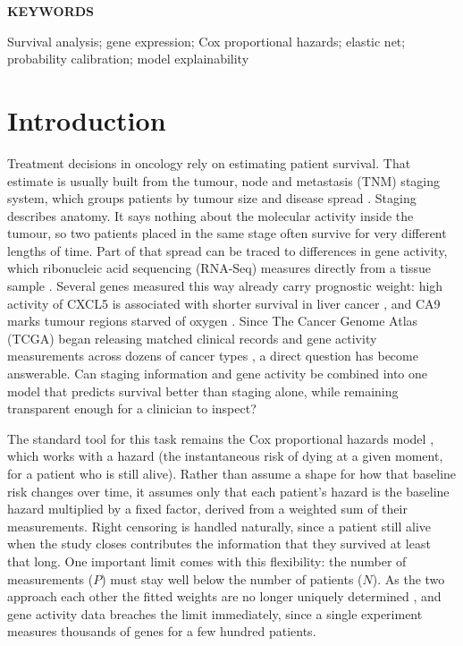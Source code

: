 \documentclass[10pt,a4paper]{article}
\begin{document}
\vspace{1em}
{\bfseries KEYWORDS\par}

Survival analysis; gene expression; Cox proportional hazards; elastic net;
probability calibration; model explainability

\vspace{3pt}

\section{Introduction}
\label{sec:introduction}

Treatment decisions in oncology rely on estimating patient survival. That estimate is usually built from the tumour, node and metastasis (TNM) staging system, which groups patients by tumour size and disease spread \citep{amin2017ajcc}. Staging describes anatomy. It says nothing about the molecular activity inside the tumour, so two patients placed in the same stage often survive for very different lengths of time. Part of that spread can be traced to differences in gene activity, which ribonucleic acid sequencing (RNA-Seq) measures directly from a tissue sample \citep{li2011rsem}. Several genes measured this way already carry prognostic weight: high activity of CXCL5 is associated with shorter survival in liver cancer \citep{zhou2012overexpression}, and CA9 marks tumour regions starved of oxygen \citep{giatromanolaki2001carbonic}. Since The Cancer Genome Atlas (TCGA) began releasing matched clinical records and gene activity measurements across dozens of cancer types \citep{weinstein2013cancer}, a direct question has become answerable. Can staging information and gene activity be combined into one model that predicts survival better than staging alone, while remaining transparent enough for a clinician to inspect?

The standard tool for this task remains the Cox proportional hazards model
\citep{cox1972regression}, which works with a hazard (the instantaneous risk of
dying at a given moment, for a patient who is still alive). Rather than assume a
shape for how that baseline risk changes over time, it assumes only that each
patient's hazard is the baseline hazard multiplied by a fixed factor, derived from
a weighted sum of their measurements. Right censoring is handled naturally, since
a patient still alive when the study closes contributes the information that they
survived at least that long. One important limit comes with this flexibility: the
number of measurements ($P$) must stay well below the number of patients ($N$). As
the two approach each other the fitted weights are no longer uniquely determined
\citep{tibshirani1997lasso}, and gene activity data breaches the limit immediately,
since a single experiment measures thousands of genes for a few hundred patients.
\end{document}
